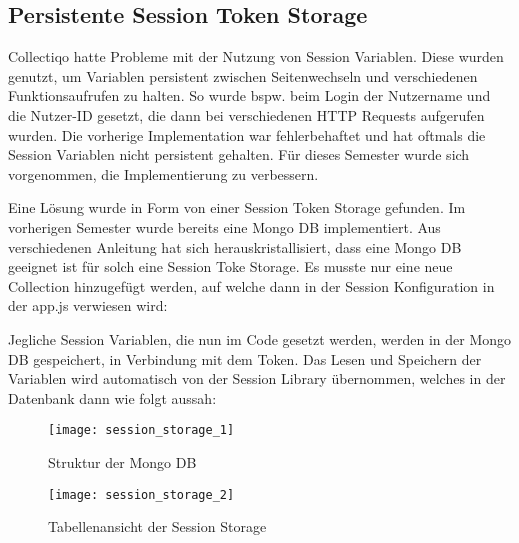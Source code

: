 \subsection{Persistente Session Token Storage}\label{subsec:persistente-session-token-storage}
Collectiqo hatte Probleme mit der Nutzung von Session Variablen.
Diese wurden genutzt, um Variablen persistent zwischen Seitenwechseln und verschiedenen Funktionsaufrufen zu halten.
So wurde bspw. beim Login der Nutzername und die Nutzer-ID gesetzt, die dann bei verschiedenen HTTP Requests aufgerufen wurden.
Die vorherige Implementation war fehlerbehaftet und hat oftmals die Session Variablen nicht persistent gehalten.
Für dieses Semester wurde sich vorgenommen, die Implementierung zu verbessern.

Eine Lösung wurde in Form von einer Session Token Storage gefunden.
Im vorherigen Semester wurde bereits eine Mongo DB implementiert.
Aus verschiedenen Anleitung hat sich herauskristallisiert, dass eine Mongo DB geeignet ist für solch eine Session Toke Storage.
Es musste nur eine neue Collection hinzugefügt werden, auf welche dann in der Session Konfiguration in der app.js verwiesen wird:

\vspace{1em}
% 
\vspace{1em}

Jegliche Session Variablen, die nun im Code gesetzt werden, werden in der Mongo DB gespeichert, in Verbindung mit dem Token.
Das Lesen und Speichern der Variablen wird automatisch von der Session Library übernommen, welches in der Datenbank dann wie folgt aussah:


\begin{figure}[h]
    \centering
    \texttt{[image: session\_storage\_1]}
    \caption{Struktur der Mongo DB}
    \label{fig:session:_storage_1}
\end{figure}


\begin{figure}[h]
    \centering
    \texttt{[image: session\_storage\_2]}
    \caption{Tabellenansicht der Session Storage}
    \label{fig:session_storage_2}
\end{figure}